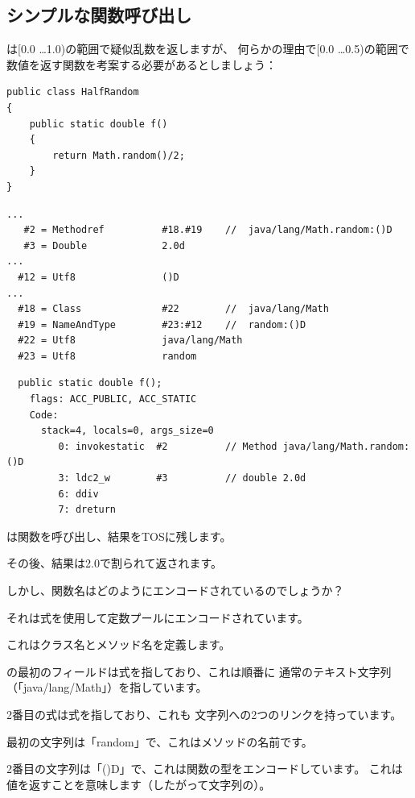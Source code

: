 \subsection{シンプルな関数呼び出し}

は[0.0 \dots 1.0)の範囲で疑似乱数を返しますが、
何らかの理由で[0.0 \dots 0.5)の範囲で数値を返す関数を考案する必要があるとしましょう：

\begin{lstlisting}[style=customjava]
public class HalfRandom
{ 
	public static double f()
	{
		return Math.random()/2;
	}
}
\end{lstlisting}

\begin{lstlisting}[caption=定数プール]
...
   #2 = Methodref          #18.#19    //  java/lang/Math.random:()D
   #3 = Double             2.0d
...
  #12 = Utf8               ()D
...
  #18 = Class              #22        //  java/lang/Math
  #19 = NameAndType        #23:#12    //  random:()D
  #22 = Utf8               java/lang/Math
  #23 = Utf8               random
\end{lstlisting}

\begin{lstlisting}
  public static double f();
    flags: ACC_PUBLIC, ACC_STATIC
    Code:
      stack=4, locals=0, args_size=0
         0: invokestatic  #2          // Method java/lang/Math.random:()D
         3: ldc2_w        #3          // double 2.0d
         6: ddiv          
         7: dreturn       
\end{lstlisting}

は関数を呼び出し、結果を\ac{TOS}に残します。

その後、結果は2.0で割られて返されます。

しかし、関数名はどのようにエンコードされているのでしょうか？

それは式を使用して定数プールにエンコードされています。

これはクラス名とメソッド名を定義します。

の最初のフィールドは式を指しており、これは順番に
通常のテキスト文字列（「java/lang/Math」）を指しています。

2番目の式は式を指しており、これも
文字列への2つのリンクを持っています。

最初の文字列は「random」で、これはメソッドの名前です。

2番目の文字列は「()D」で、これは関数の型をエンコードしています。
これは値を返すことを意味します（したがって文字列の）。


